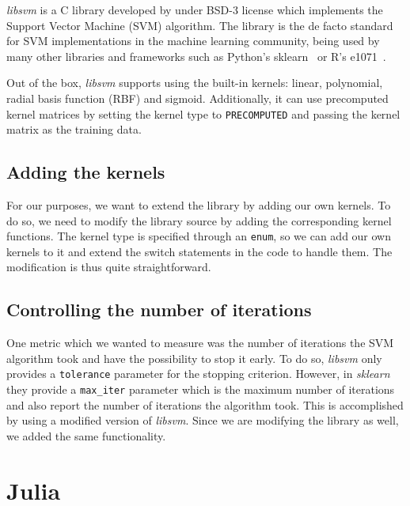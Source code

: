 \emph{libsvm} is a C library developed by \textcite{CC01a} under BSD-3 license which implements the
Support Vector Machine (SVM) algorithm. The library is the de facto standard for SVM implementations in
the machine learning community, being used by many other libraries and frameworks such as
Python's sklearn~\cite{ScikitlearnScikitlearn2023} or R's e1071~\cite{meyer[autE1071MiscFunctions2023}.

Out of the box, \emph{libsvm} supports using the built-in kernels: linear, polynomial,
radial basis function (RBF) and sigmoid. Additionally, it can use precomputed kernel matrices
by setting the kernel type to \texttt{PRECOMPUTED} and passing the kernel matrix as the
training data.

\subsection{Adding the kernels}

For our purposes, we want to extend the library by adding our own kernels. To do so, we
need to modify the library source by adding the corresponding kernel functions. The kernel
type is specified through an \texttt{enum}, so we can add our own kernels to it and extend the
switch statements in the code to handle them. The modification is thus quite straightforward.

\subsection{Controlling the number of iterations}

One metric which we wanted to measure was the number of iterations the SVM algorithm took
and have the possibility to stop it early. To do so, \emph{libsvm} only provides a
\texttt{tolerance} parameter for the stopping criterion. However, in \emph{sklearn}
they provide a \texttt{max\_iter} parameter which is the maximum number of iterations
and also report the number of iterations the algorithm took. This is accomplished by 
using a modified version of \emph{libsvm}. Since we are modifying the library as well,
we added the same functionality.

\section{Julia}%
\label{sub:impl_julia}

